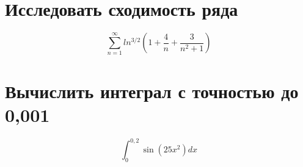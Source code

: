 \documentclass[a4paper,12pt]{article}
\begin{document}
	\section{Исследовать сходимость ряда}
	

	\begin{equation*}
	\sum_{n=1}^{\infty} ln^{3/2}\left(1+\frac{4}{n}+\frac{3}{n^2+1}\right)
	\end{equation*}
	
	\section{Вычислить интеграл с точностью до 0,001}

	\begin{equation*}
	\int_{0}^{0,2} \sin(25x^2)dx
	\end{equation*}
		
\end{document}
